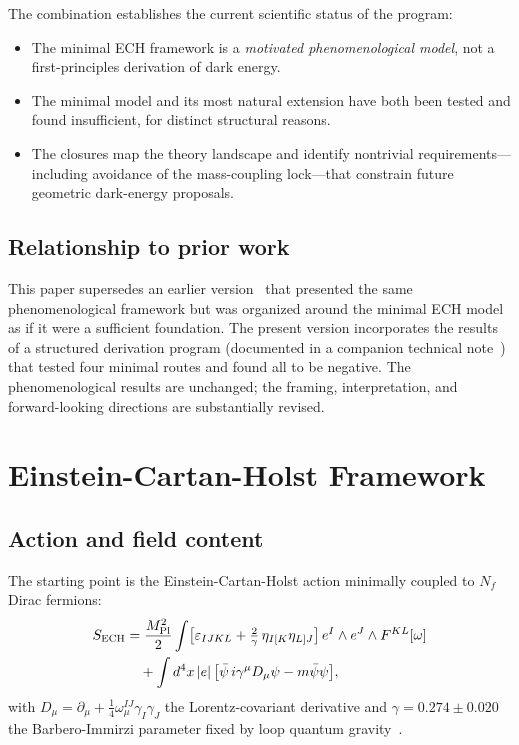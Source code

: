 \documentclass[aps,prd,twocolumn,superscriptaddress,showpacs,preprintnumbers,
  nofootinbib,longbibliography,floatfix]{revtex4-2}
\newcommand{\MPl}{M_{\rm Pl}}
\newcommand{\BI}{\gamma}
\begin{document}
The combination establishes the current scientific status of the program:
\begin{itemize}[leftmargin=*]
  \item The minimal ECH framework is a \textit{motivated phenomenological
    model}, not a first-principles derivation of dark energy.
  \item The minimal model and its most natural extension have both been
    tested and found insufficient, for distinct structural reasons.
  \item The closures map the theory landscape and identify nontrivial
    requirements---including avoidance of the mass-coupling lock---that
    constrain future geometric dark-energy proposals.
\end{itemize}

\subsection{Relationship to prior work}

This paper supersedes an earlier version~\cite{Golden2026v1} that
presented the same phenomenological framework but was organized around
the minimal ECH model as if it were a sufficient foundation. The present
version incorporates the results of a structured derivation program
(documented in a companion technical note~\cite{Golden2026supplement})
that tested four minimal routes and found all to be negative. The
phenomenological results are unchanged; the framing, interpretation, and
forward-looking directions are substantially revised.


\section{Einstein-Cartan-Holst Framework}\label{sec:ech}

\subsection{Action and field content}\label{sec:action}

The starting point is the Einstein-Cartan-Holst action minimally coupled
to $N_f$ Dirac fermions:
\begin{align}\label{eq:ECH}
  S_{\rm ECH} &= \frac{\MPl^2}{2}\int
    \bigl[\varepsilon_{IJKL} + \tfrac{2}{\BI}\,\eta_{I[K}\eta_{L]J}\bigr]\,
    e^I\wedge e^J\wedge F^{KL}[\omega] \nonumber\\
  &\quad + \int d^4x\,|e|\,\bigl[\bar\psi\,i\gamma^\mu D_\mu\psi
    - m\bar\psi\psi\bigr],
\end{align}
with $D_\mu = \partial_\mu + \tfrac{1}{4}\omega_\mu^{IJ}\gamma_I\gamma_J$
the Lorentz-covariant derivative and $\BI = 0.274 \pm 0.020$ the
Barbero-Immirzi parameter fixed by loop quantum gravity~\cite{Ashtekar2011}.
\end{document}
